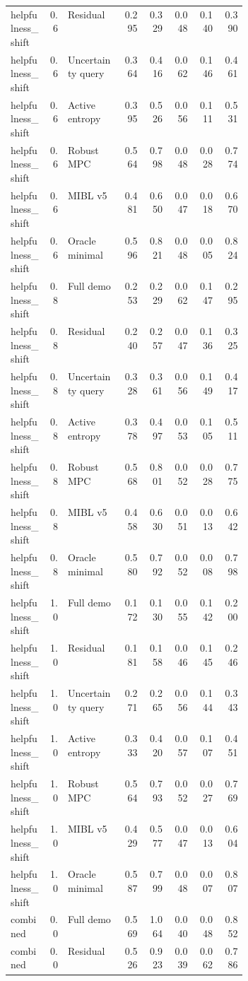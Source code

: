 \documentclass{article}
\begin{document}
\begin{center}
\begin{longtable}{p{0.16\linewidth}rp{0.23\linewidth}rrrrr}
helpfulness\_shift & 0.6 & Residual & 0.295 & 0.329 & 0.048 & 0.140 & 0.390\\
helpfulness\_shift & 0.6 & Uncertainty query & 0.364 & 0.416 & 0.062 & 0.146 & 0.461\\
helpfulness\_shift & 0.6 & Active entropy & 0.395 & 0.526 & 0.056 & 0.111 & 0.531\\
helpfulness\_shift & 0.6 & Robust MPC & 0.564 & 0.798 & 0.048 & 0.028 & 0.774\\
helpfulness\_shift & 0.6 & MIBL v5 & 0.481 & 0.650 & 0.047 & 0.018 & 0.670\\
helpfulness\_shift & 0.6 & Oracle minimal & 0.596 & 0.821 & 0.048 & 0.005 & 0.824\\
helpfulness\_shift & 0.8 & Full demo & 0.253 & 0.229 & 0.062 & 0.147 & 0.295\\
helpfulness\_shift & 0.8 & Residual & 0.240 & 0.257 & 0.047 & 0.136 & 0.325\\
helpfulness\_shift & 0.8 & Uncertainty query & 0.328 & 0.361 & 0.056 & 0.149 & 0.417\\
helpfulness\_shift & 0.8 & Active entropy & 0.378 & 0.497 & 0.053 & 0.105 & 0.511\\
helpfulness\_shift & 0.8 & Robust MPC & 0.568 & 0.801 & 0.052 & 0.028 & 0.775\\
helpfulness\_shift & 0.8 & MIBL v5 & 0.458 & 0.630 & 0.051 & 0.013 & 0.642\\
helpfulness\_shift & 0.8 & Oracle minimal & 0.580 & 0.792 & 0.052 & 0.008 & 0.798\\
helpfulness\_shift & 1.0 & Full demo & 0.172 & 0.130 & 0.055 & 0.142 & 0.200\\
helpfulness\_shift & 1.0 & Residual & 0.181 & 0.158 & 0.046 & 0.145 & 0.246\\
helpfulness\_shift & 1.0 & Uncertainty query & 0.271 & 0.265 & 0.056 & 0.144 & 0.343\\
helpfulness\_shift & 1.0 & Active entropy & 0.333 & 0.420 & 0.057 & 0.107 & 0.451\\
helpfulness\_shift & 1.0 & Robust MPC & 0.564 & 0.793 & 0.052 & 0.027 & 0.769\\
helpfulness\_shift & 1.0 & MIBL v5 & 0.429 & 0.577 & 0.047 & 0.013 & 0.604\\
helpfulness\_shift & 1.0 & Oracle minimal & 0.587 & 0.799 & 0.048 & 0.007 & 0.807\\
combined & 0.0 & Full demo & 0.569 & 1.064 & 0.040 & 0.048 & 0.852\\
combined & 0.0 & Residual & 0.526 & 0.923 & 0.039 & 0.062 & 0.786\\

\end{longtable}
\end{center}
\end{document}
